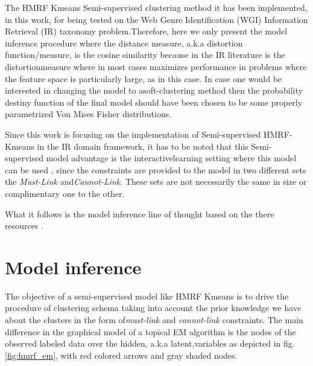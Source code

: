 \documentclass[dvips,dvipdfm,pdftex]{llncs}
\begin{document}
The HMRF Kmeans Semi-supervised clustering method it has been implemented, in this work, for being tested on the Web Genre Identification (WGI) Information Retrieval (IR) taxonomy problem.Therefore, here we only present the model inference procedure where the distance measure, a.k.a distortion function/measure, is the cosine similarity because in the IR literature is the distortionmeasure where in most cases maximizes performance in problems where the feature space is particularly large, as in this case. In case one would be interested in changing the model to asoft-clustering method then the probability destiny function of the final model should have been chosen to be some properly parametrized Von Mises Fisher distributions.

Since this work is focusing on the implementation of Semi-supervised HMRF-Kmeans in the IR domain framework, it has to be noted that this Semi-supervised model advantage is the interactivelearning setting where this model can be used \cite{chapelle2006semi_hmrf_kmeans}, since the constraints are provided to the model in two different sets the \emph{Must-Link} and\emph{Cannot-Link}. These sets are not necessarily the same in size or complimentary one to the other.

What it follows is the model inference line of thought based on the there resources \cite{basu2004probabilistic,chapelle2006semi_hmrf_kmeans,bishop2006_EM_general_view}.


\section{Model inference}\label{sec:model_inference}
The objective of a semi-supervised model like HMRF Kmeans is to drive the procedure of clustering schema taking into account the prior knowledge we have about the clusters in the form of\emph{must-link} and \emph{cannot-link} constraints. The main difference in the graphical model of a topical EM algorithm is the nodes of the observed labeled data over the hidden, a.k.a latent,variables as depicted in fig.\ref{fig:hmrf_em}, with red colored arrows and gray shaded nodes.
\end{document}

